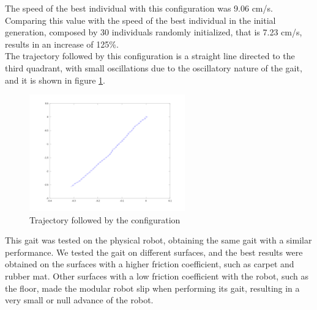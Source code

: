 The speed of the best individual with this configuration was 9.06 cm/s. Comparing this value with the speed of the best individual in the initial generation, composed by 30 individuals randomly initialized, that is 7.23 cm/s, results in an increase of 125\%.\\

The trajectory followed by this configuration is a straight line directed to the third quadrant, with small oscillations due to the oscillatory nature of the gait, and it is shown in figure \ref{fig:robot_7_trajectory}.\\

\begin{figure}[h]
		\centering
        \includegraphics[width=0.6\textwidth]{images/results_7_trajectory.png}
        \caption{Trajectory followed by the \robotSeven configuration}
        \label{fig:robot_7_trajectory}
\end{figure} 

This gait was tested on the physical robot, obtaining the same gait with a similar performance. We tested the gait on different surfaces, and the best results were obtained on the surfaces with a higher friction coefficient, such as carpet and rubber mat. Other surfaces with a low friction coefficient with the robot, such as the floor, made the modular robot slip when performing its gait, resulting in a very small or null advance of the robot.\\ 

